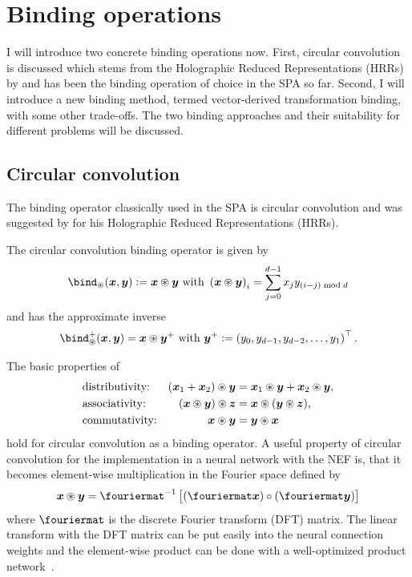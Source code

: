 \section{Binding operations}
I will introduce two concrete binding operations now.
First, circular convolution is discussed which stems from the Holographic Reduced Representations (HRRs) by \textcite{plate1995,plate2003} and has been the binding operation of choice in the SPA so far.
Second, I will introduce a new binding method, termed vector-derived transformation binding, with some other trade-offs.
The two binding approaches and their suitability for different problems will be discussed.

\subsection{Circular convolution}
The binding operator classically used in the SPA is circular convolution and was suggested by \textcite{plate1995,plate2003} for his Holographic Reduced Representations (HRRs).
\begin{defn}
    The circular convolution binding operator is given by
    \begin{equation}
        \bind_{\circledast}(\vc x, \vc y) := \vc x \circledast \vc y\ \text{with}\ \del{\vc x \circledast \vc y}_i = \sum_{j=0}^{d - 1} x_j y_{(i - j) \bmod d}
    \end{equation}
    and has the approximate inverse~\parencite{plate2003}
    \begin{equation}
        \bind^+_{\circledast}(\vc x, \vc y) = \vc x \circledast \vc y^+\ \text{with}\ \vc y^+ := \del{y_0, y_{d-1}, y_{d-2}, \dotsc, y_1}\Tr \text{.}
    \end{equation}
\end{defn}

The basic properties of
\begin{align}
    &\text{distributivity:} &(\bm{x}_1 + \bm{x}_2) \circledast \bm{y} &= \bm{x}_1 \circledast \bm{y} + \bm{x}_2 \circledast \bm{y} \text{,}\\
    &\text{associativity:} &(\bm{x} \circledast \bm{y}) \circledast \bm{z} &= \bm{x} \circledast (\bm{y} \circledast \bm{z}) \text{,} \\
    &\text{commutativity:} &\bm{x} \circledast \bm{y} &= \bm{y} \circledast \bm{x}
\end{align}
hold for circular convolution as a binding operator.
A useful property of circular convolution for the implementation in a neural network with the NEF is, that it becomes element-wise multiplication in the Fourier space defined by
\begin{equation}
    \vc x \circledast \vc y = \fouriermat^{-1}\sbr{(\fouriermat \vc x) \circ (\fouriermat \vc y)}
\end{equation}
where $\fouriermat$ is the discrete Fourier transform (DFT) matrix.
The linear transform with the DFT matrix can be put easily into the neural connection weights and the element-wise product can be done with a well-optimized product network~\parencite{gosmann2015-1}.

